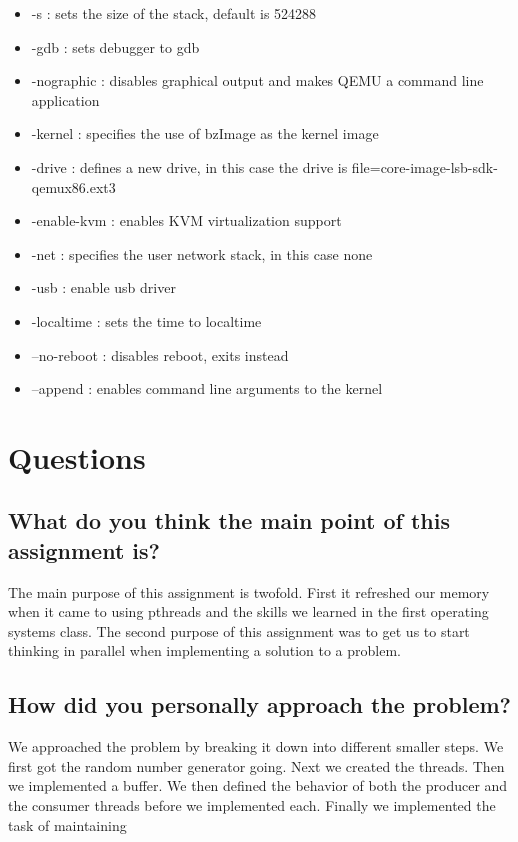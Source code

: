 \documentclass[letterpaper,10pt,titlepage, onecolumn, compsoc]{IEEEtran}
\begin{document}
\begin{itemize}  
\item -s :  sets the size of the stack, default is 524288
\item -gdb : sets debugger to gdb
\item -nographic : disables graphical output and makes QEMU a command line application 
\item -kernel : specifies the use of bzImage as the kernel image 
\item -drive : defines a new drive, in this case  the drive is file=core-image-lsb-sdk-qemux86.ext3
\item -enable-kvm : enables KVM virtualization support
\item -net : specifies the user network stack, in this case none
\item -usb : enable usb driver
\item -localtime : sets the time to localtime
\item --no-reboot : disables reboot, exits instead
\item --append : enables command line arguments to the kernel
\end{itemize}



\section{Questions}

\subsection{What do you think the main point of this assignment is?}
The main purpose of this assignment is twofold.
First it refreshed our memory when it came to using pthreads and the skills we learned in the first operating systems class. The second purpose of this assignment was to get us to start thinking in parallel when implementing a solution to a problem.    

\subsection{How did you personally approach the problem?}
We approached the problem by breaking it down into different smaller steps. We first got the random number generator going. Next we created the threads. Then we implemented a buffer. We then defined the behavior of both the producer and the consumer threads before we implemented each. Finally we implemented the task of maintaining  
\end{document}
